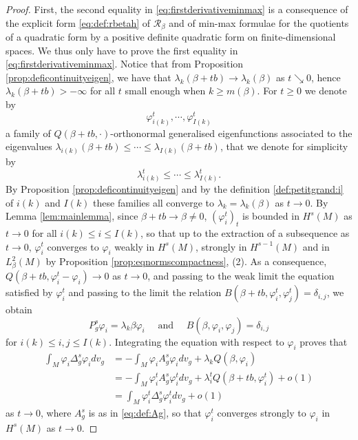 \documentclass[10pt]{amsart}
\numberwithin{equation}{section}
\newcommand{\vp}{\varphi}
\theoremstyle{plain}
\theoremstyle{remark}
\begin{document}
\begin{proof} First, the second equality in \eqref{eq:firstderivativeminmax} is a consequence of the explicit form \eqref{eq:def:rbetah} of $\mathcal{R}_\beta$ and of min-max formulae for the quotients of a quadratic form by a positive definite quadratic form on finite-dimensional spaces. We thus only have to prove the first equality in \eqref{eq:firstderivativeminmax}. Notice that from Proposition \ref{prop:deficontinuityeigen}, we have that $\lambda_k(\beta+tb) \to \lambda_k(\beta)$ as $t \searrow 0$, hence $\lambda_k(\beta+tb) > - \infty$ for all $t$ small enough when $k \ge m(\beta)$. For $t \ge0$ we denote by 
$$\vp_{i(k)}^t,\cdots, \vp_{I(k)}^t$$
a family of $Q(\beta+tb,\cdot)$-orthonormal generalised eigenfunctions associated to the eigenvalues $\lambda_{i(k)}(\beta+tb) \leq \cdots \leq \lambda_{I(k)}(\beta+tb)$, that we denote for simplicity by 
$$\lambda_{i(k)}^t \leq \cdots \leq \lambda_{I(k)}^t.$$
By Proposition \ref{prop:deficontinuityeigen} and by the definition \eqref{def:petitgrand:i} of $i(k)$ and $I(k)$ these families  all converge to $\lambda_k = \lambda_k(\beta)$ as $t\to 0$.
By Lemma \ref{lem:mainlemma}, since $\beta + t b \to \beta \neq 0$, $(\vp_i^t)_t$ is bounded in $H^s(M)$ as $t \to 0$ for all $i(k)\leq i \leq I(k)$, so that up to the extraction of a subsequence as $t \to 0$, $\vp_i^t$ converges to $\vp_i$ weakly in $H^s(M)$, strongly in $H^{s-1}(M)$ and in $L^2_\beta(M)$ by Proposition \ref{prop:eqnormscompactness}, (2). As a consequence, $ Q(\beta+tb , \vp_i^t - \vp_i) \to 0 $ as $t\to 0$, and passing to the weak limit the equation satisfied by $\vp_i^t$ and passing to the limit the relation $B(\beta+tb,\vp_i^t,\vp_j^t) = \delta_{i,j}$, we obtain
$$ P_g^s \vp_i = \lambda_k \beta \vp_i \quad \text{ and } \quad  B(\beta,\vp_i,\vp_j) = \delta_{i,j} $$
for $i(k)\leq i,j\leq I(k)$. Integrating the equation with respect to $\vp_i$ proves that
\begin{equation*}
\begin{split} \int_M \vp_i \Delta_g^s \vp_i dv_g & = -\int_M \vp_i A_g^s \vp_i dv_g + \lambda_k Q(\beta,\vp_i) 
\\ & = -\int_M \vp_i^t A_g^s \vp_i^t dv_g + \lambda_i^t Q(\beta+tb,\vp_i^t) + o(1) \\
& = \int_M \vp_i^t \Delta_g^s \vp_i^t dv_g  + o(1)
\end{split} \end{equation*}
as $t \to 0$, where $A_g^s$ is as in \eqref{eq:def:Ag}, so that $\vp_i^t$ converges strongly to $\vp_i$ in $H^s(M)$ as $t \to 0$.


\end{proof}
\end{document}
